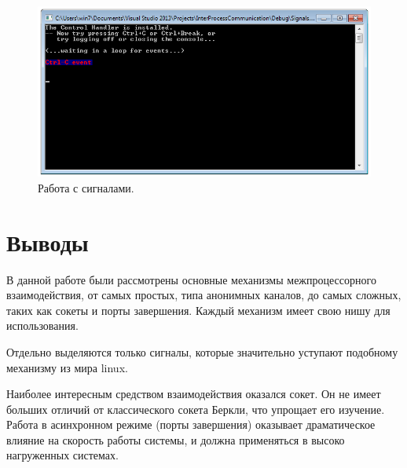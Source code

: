 \documentclass[a4paper,12pt]{article} %
\begin{document}
\begin{figure}[h!]
\centering
\includegraphics[scale=0.8]{img/07_Signals}
\caption{Работа с сигналами.}
\end{figure}

\newpage
\section*{Выводы}

В данной работе были рассмотрены основные механизмы межпроцессорного взаимодействия, от самых простых, типа анонимных каналов, до самых сложных, таких как сокеты и порты завершения. Каждый механизм имеет свою нишу для использования.

Отдельно выделяются только сигналы, которые значительно уступают подобному механизму из мира linux.

Наиболее интересным средством взаимодействия оказался сокет. Он не имеет больших отличий от классического сокета Беркли, что упрощает его изучение. Работа в асинхронном режиме (порты завершения) оказывает драматическое влияние на скорость работы системы, и должна применяться в высоко нагруженных системах.
\end{document}
